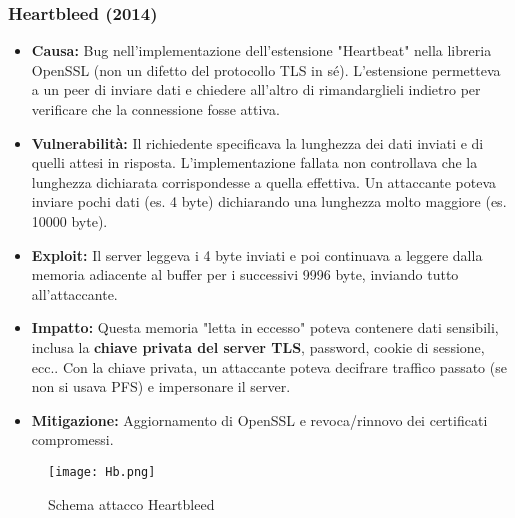 \documentclass[../main.tex]{subfiles}
\begin{document}
\begin{enumerate}
\subsubsection{Heartbleed (2014)}
\begin{itemize}
    \item \textbf{Causa:} Bug nell'implementazione dell'estensione "Heartbeat" nella libreria OpenSSL (non un difetto del protocollo TLS in sé). L'estensione permetteva a un peer di inviare dati e chiedere all'altro di rimandarglieli indietro per verificare che la connessione fosse attiva.
    \item \textbf{Vulnerabilità:} Il richiedente specificava la lunghezza dei dati inviati e di quelli attesi in risposta. L'implementazione fallata non controllava che la lunghezza dichiarata corrispondesse a quella effettiva. Un attaccante poteva inviare pochi dati (es. 4 byte) dichiarando una lunghezza molto maggiore (es. 10000 byte).
    \item \textbf{Exploit:} Il server leggeva i 4 byte inviati e poi continuava a leggere dalla memoria adiacente al buffer per i successivi 9996 byte, inviando tutto all'attaccante.
    \item \textbf{Impatto:} Questa memoria "letta in eccesso" poteva contenere dati sensibili, inclusa la \textbf{chiave privata del server TLS}, password, cookie di sessione, ecc.. Con la chiave privata, un attaccante poteva decifrare traffico passato (se non si usava PFS) e impersonare il server.
    \item \textbf{Mitigazione:} Aggiornamento di OpenSSL e revoca/rinnovo dei certificati compromessi.
\end{itemize}
\begin{figure}[H]
  \centering
  \texttt{[image: Hb.png]}
  \caption{Schema attacco Heartbleed}
  \label{fig:}
\end{figure}

\end{enumerate}
\end{document}
